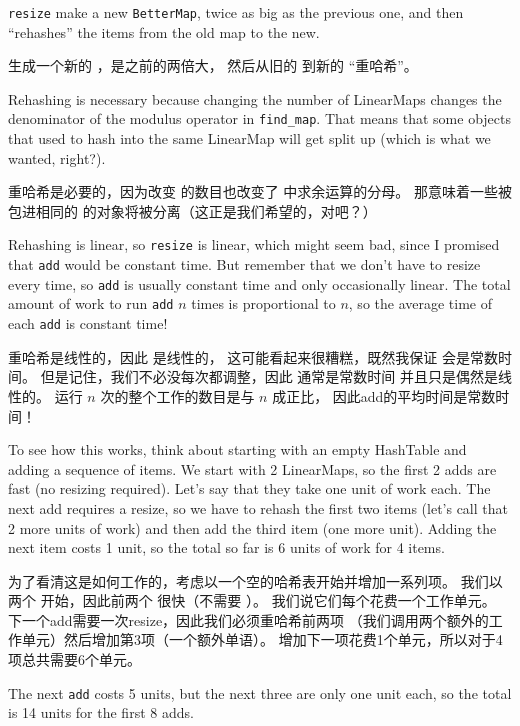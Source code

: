{\tt resize} make a new {\tt BetterMap}, twice as big as the previous
one, and then ``rehashes'' the items from the old map to the new.

 生成一个新的 ，是之前的两倍大，
然后从旧的  到新的 ``重哈希''。

Rehashing is necessary because changing the number of LinearMaps
changes the denominator of the modulus operator in
\verb"find_map".  That means that some objects that used
to hash into the same LinearMap will get split up (which is
what we wanted, right?).

重哈希是必要的，因为改变  的数目也改变了  中求余运算的分母。
那意味着一些被包进相同的  的对象将被分离（这正是我们希望的，对吧？）

Rehashing is linear, so
{\tt resize} is linear, which might seem bad, since I promised
that {\tt add} would be constant time.  But remember that
we don't have to resize every time, so {\tt add} is usually
constant time and only occasionally linear.  The total amount
of work to run {\tt add} $n$ times is proportional to $n$,
so the average time of each {\tt add} is constant time!

重哈希是线性的，因此  是线性的，
这可能看起来很糟糕，既然我保证  会是常数时间。
但是记住，我们不必没每次都调整，因此  通常是常数时间
并且只是偶然是线性的。 运行  $n$ 次的整个工作的数目是与 $n$ 成正比，
因此add的平均时间是常数时间！

To see how this works, think about starting with an empty
HashTable and adding a sequence of items.  We start with 2 LinearMaps,
so the first 2 adds are fast (no resizing required).  Let's
say that they take one unit of work each.  The next add
requires a resize, so we have to rehash the first two
items (let's call that 2 more units of work) and then
add the third item (one more unit).  Adding the next item
costs 1 unit, so the total so far is
6 units of work for 4 items.

为了看清这是如何工作的，考虑以一个空的哈希表开始并增加一系列项。
我们以两个  开始，因此前两个  很快（不需要 ）。
我们说它们每个花费一个工作单元。
下一个add需要一次resize，因此我们必须重哈希前两项
（我们调用两个额外的工作单元）然后增加第3项（一个额外单语）。
增加下一项花费1个单元，所以对于4项总共需要6个单元。

The next {\tt add} costs 5 units, but the next three
are only one unit each, so the total is 14 units for the
first 8 adds.

